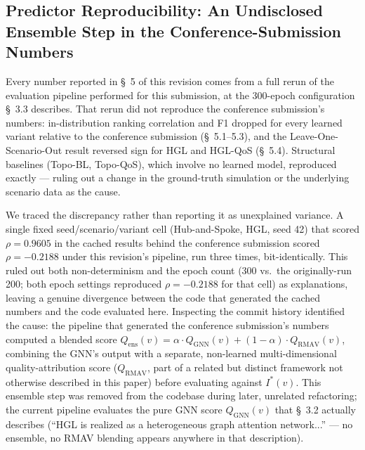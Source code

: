 \documentclass[review]{elsarticle}
\begin{document}
\subsection{Predictor Reproducibility: An Undisclosed Ensemble Step in the Conference-Submission Numbers}
\label{sec:ensemble}

Every number reported in \S~5 of this revision comes from a full rerun of the evaluation pipeline
performed for this submission, at the 300-epoch configuration \S~3.3 describes. That rerun did not
reproduce the conference submission's numbers: in-distribution ranking correlation and F1 dropped
for every learned variant relative to the conference submission (\S~5.1--5.3), and the
Leave-One-Scenario-Out result reversed sign for HGL and HGL-QoS (\S~5.4). Structural baselines
(Topo-BL, Topo-QoS), which involve no learned model, reproduced exactly --- ruling out a change in
the ground-truth simulation or the underlying scenario data as the cause.

We traced the discrepancy rather than reporting it as unexplained variance. A single fixed
seed/scenario/variant cell (Hub-and-Spoke, HGL, seed 42) that scored $\rho=0.9605$ in the cached
results behind the conference submission scored $\rho=-0.2188$ under this revision's pipeline, run
three times, bit-identically. This ruled out both non-determinism and the epoch count (300 vs.\ the
originally-run 200; both epoch settings reproduced $\rho=-0.2188$ for that cell) as explanations,
leaving a genuine divergence between the code that generated the cached numbers and the code
evaluated here. Inspecting the commit history identified the cause: the pipeline that generated the
conference submission's numbers computed a blended score
$Q_{\text{ens}}(v) = \alpha \cdot Q_{\text{GNN}}(v) + (1-\alpha) \cdot Q_{\text{RMAV}}(v)$, combining
the GNN's output with a separate, non-learned multi-dimensional quality-attribution score
($Q_{\text{RMAV}}$, part of a related but distinct framework not otherwise described in this paper)
before evaluating against $I^*(v)$. This ensemble step was removed from the codebase during later,
unrelated refactoring; the current pipeline evaluates the pure GNN score $Q_{\text{GNN}}(v)$ that
\S~3.2 actually describes (``HGL is realized as a heterogeneous graph attention network...'' --- no
ensemble, no RMAV blending appears anywhere in that description).
\end{document}
